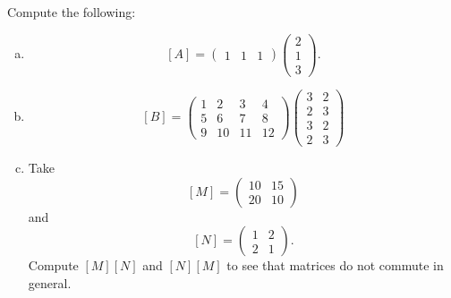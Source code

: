 \documentclass[12pt]{article} %
\begin{document}
\begin{problem}
Compute the following:
\begin{enumerate}[(a)]
    \item 
    \[
    [A]=\begin{pmatrix} 1& 1& 1 \end{pmatrix}
    \begin{pmatrix} 2\\ 1\\ 3 \end{pmatrix}.
    \]
    \item
    \[
    [B]=\begin{pmatrix} 1& 2& 3& 4\\ 5& 6& 7& 8\\ 9& 10& 11& 12\end{pmatrix}
    \begin{pmatrix} 3& 2\\ 2& 3\\ 3& 2\\ 2& 3\end{pmatrix}
    \]
    \item Take
    \[
    [M]=\begin{pmatrix} 10& 15\\ 20& 10 \end{pmatrix}
    \]
    and
    \[
    [N]=\begin{pmatrix} 1 & 2\\ 2& 1\end{pmatrix}.
    \]
    Compute $[M][N]$ and $[N][M]$ to see that matrices do not commute in general.
\end{enumerate}
\end{problem}
\end{document}
